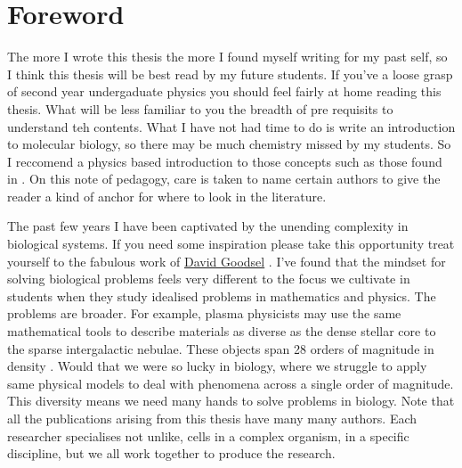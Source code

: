 \chapter*{Foreword}
\setcounter{page}{1}
\label{chap:foreward}
\chapquote{} {}
\vspace

The more I wrote this thesis the more I found myself writing for my past self, so I think this thesis will be best read by my future students. If you've a loose grasp of second year undergaduate physics you should feel fairly at home reading this thesis. What will be less familiar to you the breadth of pre requisits to understand teh contents. What I have not had time to do is write an introduction to molecular biology, so there may be much chemistry missed by my students. So I reccomend a physics based introduction to those concepts such as those found in \cite{phillips2012}. On this note of pedagogy, care is taken to name certain authors to give the reader a kind of anchor for where to look in the literature.  

The past few years I have been captivated by the unending complexity in biological systems. If you need some inspiration please take this opportunity treat yourself to the fabulous work of \href {https://pdb101.rcsb.org/sci-art/goodsell-gallery}{David Goodsel} \cite{goodsell2009, goodsell2018, goodsell2020}. I've found that the mindset for solving biological problems feels very different to the focus we cultivate in students when they study idealised problems in mathematics and physics. The problems are broader. For example, plasma physicists may use the same mathematical tools to describe materials as diverse as the dense stellar core to the sparse intergalactic nebulae. These objects span 28 orders of magnitude in density \cite{chen2018}. Would that we were so lucky in biology, where we struggle to apply same physical models to deal with phenomena across a single order of magnitude. This diversity means we need many hands to solve problems in biology. Note that all the publications arising from this thesis have many many authors. Each researcher specialises not unlike, cells in a complex organism, in a specific discipline, but we all work together to produce the research.

